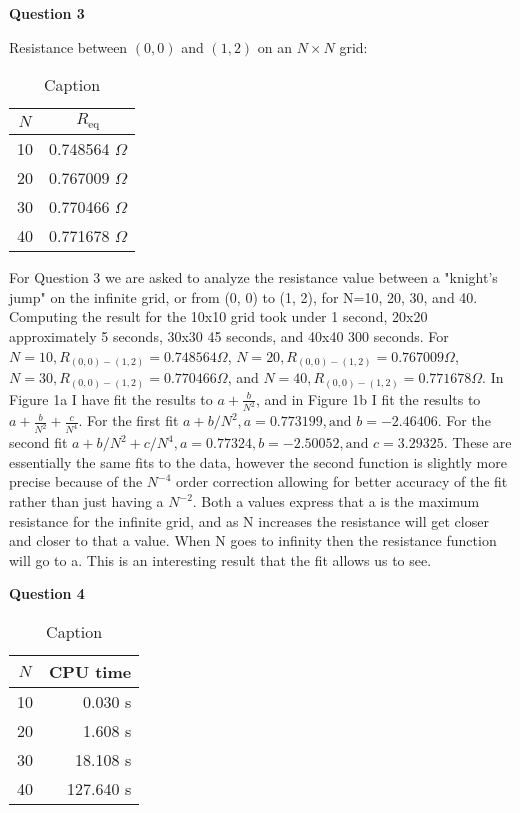 \documentclass{article}
\begin{document}
\bigskip
{\bf Question 3}
\medskip

Resistance between $(0,0)$ and $(1,2)$ on an $N\times N$ grid:
\begin{table}[H]
    \centering
    \begin{tabular}{c|c}
        $N$ & $R_\text{eq}$ \\
        \hline 
        10 & 0.748564 $\Omega$ \\
        20 & 0.767009 $\Omega$ \\
        30 & 0.770466 $\Omega$ \\
        40 & 0.771678 $\Omega$
    \end{tabular}
    \caption{Caption}
    \label{tab:knightsjump}
\end{table}

For Question 3 we are asked to analyze the resistance value between a "knight's jump" on the infinite grid, or from (0, 0) to (1, 2), for N=10, 20, 30, and 40. Computing the result for the 10x10 grid took under 1 second, 20x20 approximately 5 seconds, 30x30 45 seconds, and 40x40 300 seconds.
For $N=10, R_{(0,0)-(1,2)}=0.748564\Omega$, $N=20, R_{(0,0)-(1,2)}=0.767009\Omega$, $N=30, R_{(0,0)-(1,2)}=0.770466\Omega$, and $N=40, R_{(0,0)-(1,2)}=0.771678\Omega$.
In Figure 1a I have fit the results to $a+\frac{b}{N^2}$, and in Figure 1b I fit the results to $a+\frac{b}{N^2}+\frac{c}{N^4}$. For the first fit $a+b/N^2,  a=0.773199, \text{and } b=-2.46406$. For the second fit $a+b/N^2+c/N^4, a=0.77324, b=-2.50052, \text{and } c=3.29325$. These are essentially the same
fits to the data, however the second function is slightly more precise because of the $N^{-4}$ order correction allowing for better accuracy of the fit rather than just having a $N^{-2}$. Both a values express that a is the maximum resistance for the infinite grid, and as N increases the resistance
will get closer and closer to that a value. When N goes to infinity then the resistance function will go to a. This is an interesting result that the fit allows us to see.  

\bigskip
{\bf Question 4}
\medskip

\begin{table}[H]
    \centering
    \begin{tabular}{c|r}
        $N$ & CPU time \\
        \hline 
        10 & 0.030 s \\
        20 & 1.608 s \\
        30 & 18.108 s \\
        40 & 127.640 s
    \end{tabular}
    \caption{Caption}
    \label{tab:timing}
\end{table}
\end{document}
